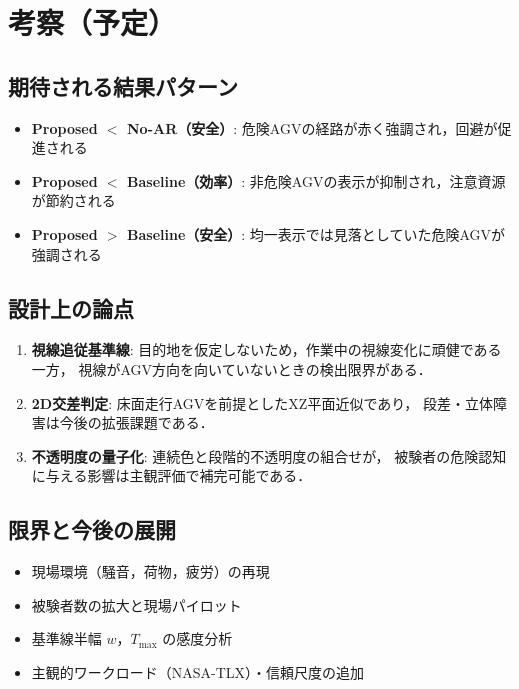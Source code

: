 \section{考察（予定）}
\label{sec:discussion}

\subsection{期待される結果パターン}

\begin{itemize}[leftmargin=2em]
  \item \textbf{Proposed $<$ No-AR（安全）}:
        危険AGVの経路が赤く強調され，回避が促進される
  \item \textbf{Proposed $<$ Baseline（効率）}:
        非危険AGVの表示が抑制され，注意資源が節約される
  \item \textbf{Proposed $>$ Baseline（安全）}:
        均一表示では見落としていた危険AGVが強調される
\end{itemize}

\subsection{設計上の論点}

\begin{enumerate}[leftmargin=2em]
  \item \textbf{視線追従基準線}:
        目的地を仮定しないため，作業中の視線変化に頑健である一方，
        視線がAGV方向を向いていないときの検出限界がある．
  \item \textbf{2D交差判定}:
        床面走行AGVを前提としたXZ平面近似であり，
        段差・立体障害は今後の拡張課題である．
  \item \textbf{不透明度の量子化}:
        連続色と段階的不透明度の組合せが，
        被験者の危険認知に与える影響は主観評価で補完可能である．
\end{enumerate}

\subsection{限界と今後の展開}

\begin{itemize}[leftmargin=2em]
  \item 現場環境（騒音，荷物，疲労）の再現
  \item 被験者数の拡大と現場パイロット
  \item 基準線半幅 $w$，$T_\text{max}$ の感度分析
  \item 主観的ワークロード（NASA-TLX）・信頼尺度の追加
\end{itemize}
